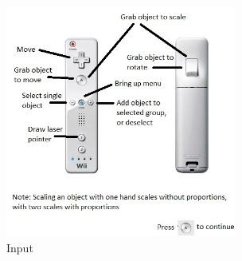 \begin{figure}[htbp]
	\centering
	\includegraphics[width=3in]{figs/help.jpg}
	\caption{Input}
	\label{fig:appendix}
\end{figure}

